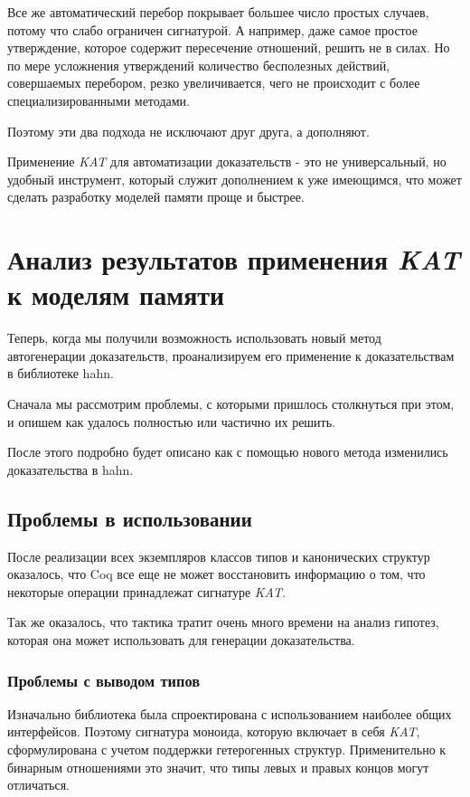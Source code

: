 \documentclass[times
              ,specification
              ,annotation
              ]{itmo-student-thesis}
\begin{document}
    Все же автоматический перебор покрывает большее число простых случаев, потому что слабо ограничен сигнатурой.
    А например, даже самое простое утверждение, которое содержит пересечение отношений, 
    решить не в силах. Но по мере усложнения утверждений количество бесполезных действий, совершаемых
    перебором, резко увеличивается, чего не происходит с более специализированными методами.
    
    Поэтому эти два подхода не исключают друг друга, а дополняют.

  \chapterconclusion
    Применение \textit{KAT} для автоматизации доказательств - это не универсальный, но удобный
    инструмент, который служит дополнением к уже имеющимся, что может сделать  разработку моделей
    памяти проще и быстрее.

\chapter{Анализ результатов применения \textit{KAT} к моделям памяти}\label{chapter:3}

  Теперь, когда мы получили возможность использовать новый метод автогенерации доказательств, проанализируем его
  применение к доказательствам в библиотеке hahn.

  Сначала мы рассмотрим проблемы, с которыми пришлось столкнуться при этом, и опишем как удалось полностью или
  частично их решить.

  После этого подробно будет описано как с помощью нового метода изменились доказательства в hahn.

  \section{Проблемы в использовании }
    После реализации всех экземпляров классов типов и канонических структур оказалось, что Coq все еще
    не может восстановить информацию о том, что некоторые операции принадлежат сигнатуре \textit{KAT}.

    Так же оказалось, что тактика  тратит очень много времени на анализ гипотез, которая она
    может использовать для генерации доказательства.
    \subsection{Проблемы с выводом типов}
      Изначально библиотека была спроектирована с использованием наиболее общих интерфейсов. Поэтому
      сигнатура моноида, которую включает в себя \textit{KAT}, сформулирована с учетом
      поддержки гетерогенных структур.
      Применительно к бинарным отношениями это значит, что типы левых и правых концов могут
      отличаться.
\end{document}
